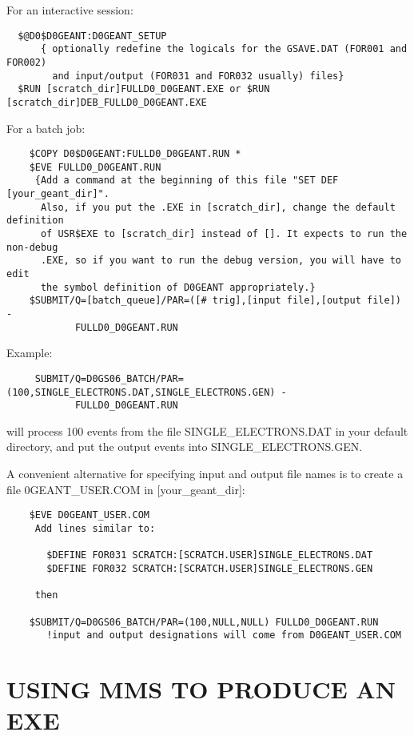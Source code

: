 For an interactive session:

\begin{verbatim}
  $@D0$D0GEANT:D0GEANT_SETUP
      { optionally redefine the logicals for the GSAVE.DAT (FOR001 and FOR002)
        and input/output (FOR031 and FOR032 usually) files}
  $RUN [scratch_dir]FULLD0_D0GEANT.EXE or $RUN [scratch_dir]DEB_FULLD0_D0GEANT.EXE
\end{verbatim}

For a batch job:

\begin{verbatim}
    $COPY D0$D0GEANT:FULLD0_D0GEANT.RUN *
    $EVE FULLD0_D0GEANT.RUN
     {Add a command at the beginning of this file "SET DEF [your_geant_dir]".
      Also, if you put the .EXE in [scratch_dir], change the default definition
      of USR$EXE to [scratch_dir] instead of []. It expects to run the non-debug
      .EXE, so if you want to run the debug version, you will have to edit
      the symbol definition of D0GEANT appropriately.}
    $SUBMIT/Q=[batch_queue]/PAR=([# trig],[input file],[output file]) -
            FULLD0_D0GEANT.RUN
\end{verbatim}

    Example:

\begin{verbatim}
     SUBMIT/Q=D0GS06_BATCH/PAR=(100,SINGLE_ELECTRONS.DAT,SINGLE_ELECTRONS.GEN) -
            FULLD0_D0GEANT.RUN
\end{verbatim}
will process 100 events from the file SINGLE\_ELECTRONS.DAT in your
default directory, and put the output events into SINGLE\_ELECTRONS.GEN.

A convenient alternative for specifying input and output file names is
to create a file \D0GEANT\_USER.COM in [your\_geant\_dir]:

\begin{verbatim}
    $EVE D0GEANT_USER.COM
     Add lines similar to:

       $DEFINE FOR031 SCRATCH:[SCRATCH.USER]SINGLE_ELECTRONS.DAT
       $DEFINE FOR032 SCRATCH:[SCRATCH.USER]SINGLE_ELECTRONS.GEN

     then

    $SUBMIT/Q=D0GS06_BATCH/PAR=(100,NULL,NULL) FULLD0_D0GEANT.RUN
       !input and output designations will come from D0GEANT_USER.COM
\end{verbatim}

\section{USING MMS TO PRODUCE AN EXE}
\label{mms}

